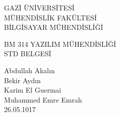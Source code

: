 \begin{titlepage}
   \begin{center}
      \begin{large}
         \vspace*{0.5cm}
         GAZİ ÜNİVERSİTESİ \\
         MÜHENDİSLİK FAKÜLTESİ \\
         BİLGİSAYAR MÜHENDİSLİĞİ

         \vfill
         BM 314 YAZILIM MÜHENDİSLİĞİ \\
         STD BELGESİ

         \vfill
         Abdullah Akalın\\Bekir Aydın\\Karim El Guermai\\Muhammed Emre Emrah\\

         \vfill
         \vspace{0.5cm}
         26.05.1017
      \end{large}
   \end{center}
\end{titlepage}
